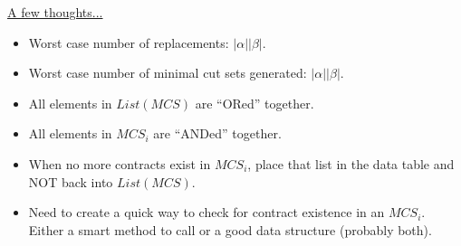 \underline{A few thoughts...}
\begin{itemize}
\item Worst case number of replacements: $|\alpha||\beta|$. 
\item Worst case number of minimal cut sets generated: $|\alpha||\beta|$. 
\item All elements in $List(MCS)$ are ``ORed'' together.
\item All elements in $MCS_i$ are ``ANDed'' together.
\item When no more contracts exist in $MCS_i$, place that list in the data table and NOT back into $List(MCS)$. 
\item Need to create a quick way to check for contract existence in an $MCS_i$. Either a smart method to call or a good data structure (probably both). 

\end{itemize}






























